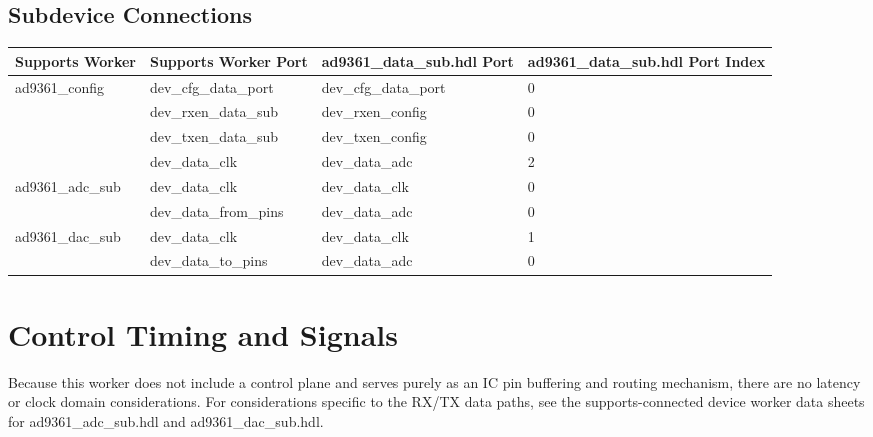 \documentclass{article}
\def\comp{ad9361\_data\_sub}
\begin{document}
\begin{landscape}
	\section*{Subdevice Connections}
	\begin{scriptsize}
		\begin{tabular}{|p{5cm}|p{5cm}|p{5cm}|p{6.73cm}|}
			\hline
			\rowcolor{blue}
			Supports Worker & Supports Worker Port & \comp{}.hdl Port     & \comp{}.hdl Port Index \\
			\hline
			\multirow{4}{*}{ad9361\_config}& dev\_cfg\_data\_port & dev\_cfg\_data\_port & 0                      \\
			\cline{2-4}
			                & dev\_rxen\_data\_sub & dev\_rxen\_config    & 0                      \\
			\cline{2-4}
			                & dev\_txen\_data\_sub & dev\_txen\_config    & 0                      \\
			\cline{2-4}
			                & dev\_data\_clk       & dev\_data\_adc       & 2                      \\
			\hline
			\multirow{2}{*}{ad9361\_adc\_sub}& dev\_data\_clk       & dev\_data\_clk       & 0                      \\
			\cline{2-4}
			                & dev\_data\_from\_pins& dev\_data\_adc       & 0                      \\
			\hline
			\multirow{2}{*}{ad9361\_dac\_sub}& dev\_data\_clk       & dev\_data\_clk       & 1                      \\
			\cline{2-4}
			                & dev\_data\_to\_pins  & dev\_data\_adc       & 0                      \\
			\hline
		\end{tabular}
	\end{scriptsize}

\end{landscape}

\section*{Control Timing and Signals}
Because this worker does not include a control plane and serves purely as an IC pin buffering and routing mechanism, there are no latency or clock domain considerations. For considerations specific to the RX/TX data paths, see the supports-connected device worker data sheets for  ad9361\_adc\_sub.hdl\cite{adc_comp_datasheet} and ad9361\_dac\_sub.hdl\cite{dac_comp_datasheet}.
\end{document}
